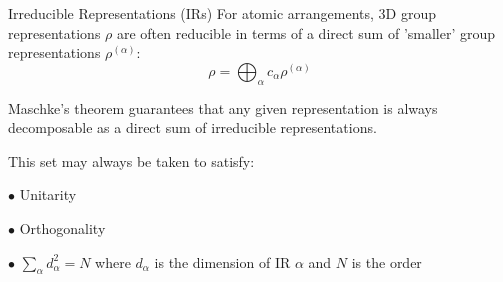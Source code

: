\documentclass[11pt]{beamer}
\begin{document}
\begin{frame}{Irreducible Representations (IRs)}
	For atomic arrangements, 3D group representations $\rho$ are  often reducible in terms of a direct sum of 'smaller' group representations $\rho^{(\alpha)}$:
	$$
	\rho = \bigoplus_{\alpha}c_{\alpha}\rho^{(\alpha)}
	$$
	
	Maschke's theorem guarantees that any given representation is always decomposable as a direct sum of irreducible representations. 

	\vspace{0.3cm}
	
	This set may always be taken to satisfy:
	
	\medskip
	
	$\bullet$ Unitarity
	
	\medskip
	
	$\bullet$ Orthogonality
	
	\medskip
	
	$\bullet$ $\sum_{\alpha} d_{\alpha}^2 = N $ where $d_{\alpha} $ is the dimension of IR $\alpha$ and $N$ is the order
	
\end{frame}
\end{document}
